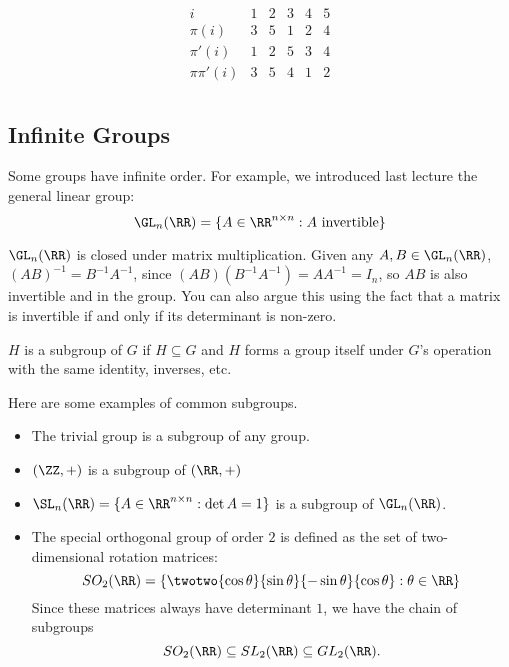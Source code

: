 \[\begin{array}{c|ccccc}
     i&1&2&3&4&5  \\
     \hline
     \pi(i)&3&5&1&2&4\\
     \pi'(i)&1&2&5&3&4\\
     \pi\pi'(i)&3&5&4&1&2 \\
\end{array}\]

\subsection{Infinite Groups}

Some groups have infinite order. For example, we introduced last lecture the general linear group:
\[\GL_n(\RR) = \{A\in \RR^{n\times n} : A\text{ invertible}\}\]

$\GL_n(\RR)$ is closed under matrix multiplication. Given any $A,B\in \GL_n(\RR)$, $(AB)^{-1} = B^{-1}A^{-1}$, since $(AB)(B^{-1}A^{-1}) = AA^{-1} = I_n$, so $AB$ is also invertible and in the group. You can also argue this using the fact that a matrix is invertible if and only if its determinant is non-zero. 

\begin{definition}

$H$ is a \ac{subgroup} of $G$ if $H\subseteq G$ and $H$ forms a group itself under $G$'s operation with the same identity, inverses, etc. 
\end{definition}

\begin{example}
\exlabel

Here are some examples of common subgroups. 
\end{example}

\begin{itemize}
    \item The trivial group is a subgroup of any group. 
    \item $(\ZZ, +)$ is a subgroup of $(\RR, +)$
    \item $\SL_n(\RR) = \{A\in \RR^{n\times n}: \det A=1\}$ is a subgroup of $\GL_n(\RR)$. 
    \item The \ac{special orthogonal group} of order $2$ is defined as the set of two-dimensional rotation matrices:
    \[SO_2(\RR) = \left\{\twotwo{\cos{\theta}}{\sin{\theta}}{-\sin{\theta}}{\cos{\theta}}: \theta \in \RR\right\}\]
    Since these matrices always have determinant $1$, we have the chain of subgroups
    \[SO_2(\RR)\subseteq SL_2(\RR)\subseteq GL_2(\RR).\]
\end{itemize}

